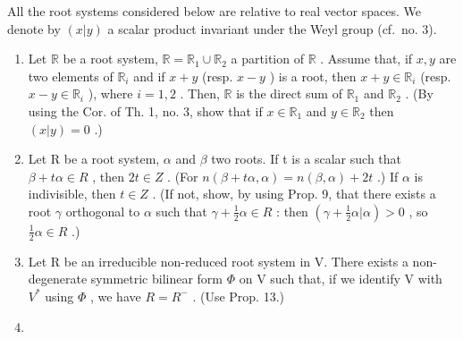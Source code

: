 
All the root systems considered below are relative to real vector spaces. We denote by \((x|y)\) a scalar product invariant under the Weyl group (cf.~no. 3).

\begin{enumerate}
\def\labelenumi{\arabic{enumi})}
\item
  Let \(\mathbb{R}\) be a root system, \(\mathbb{R} = \mathbb{R}_1 \cup \mathbb{R}_2\) a partition of \(\mathbb{R}\) . Assume that, if \(x, y\) are two elements of \(\mathbb{R}_i\) and if \(x + y\) (resp. \(x - y\) ) is a root, then \(x + y \in \mathbb{R}_i\) (resp. \(x - y \in \mathbb{R}_i\) ), where \(i = 1, 2\) . Then, \(\mathbb{R}\) is the direct sum of \(\mathbb{R}_1\) and \(\mathbb{R}_2\) . (By using the Cor. of Th. 1, no. 3, show that if \(x \in \mathbb{R}_1\) and \(y \in \mathbb{R}_2\) then \((x|y) = 0\) .)
\item
  Let R be a root system, \(\alpha\) and \(\beta\) two roots. If t is a scalar such that \(\beta + t\alpha \in R\) , then \(2t \in Z\) . (For \(n(\beta + t\alpha, \alpha) = n(\beta, \alpha) + 2t\) .) If \(\alpha\) is indivisible, then \(t \in Z\) . (If not, show, by using Prop. 9, that there exists a root \(\gamma\) orthogonal to \(\alpha\) such that \(\gamma + \frac{1}{2}\alpha \in R\) : then \((\gamma + \frac{1}{2}\alpha|\alpha) > 0\) , so \(\frac{1}{2}\alpha \in R\) .)
\item
  Let R be an irreducible non-reduced root system in V. There exists a non-degenerate symmetric bilinear form \(\Phi\) on V such that, if we identify V with \(V^{*}\) using \(\Phi\) , we have \(R = R^{-}\) . (Use Prop. 13.)
\item

\end{enumerate}
